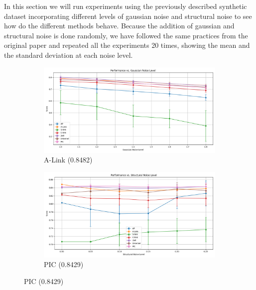 \documentclass[
	10pt,
	parskip=half-,	
	paper=a4,
	english
	]{scrartcl}
\begin{document}
In this section we will run experiments using the previously described synthetic dataset incorporating different levels of gaussian noise and structural noise to see how do the different methods behave. Because the addition of gaussian and structural noise is done randomly, we have followed the same practices from the original paper and repeated all the experiments 20 times, showing the mean and the standard deviation at each noise level.

\begin{figure}[h!]
    \centering
    \begin{subfigure}[b]{0.45\textwidth}
        \includegraphics[width=\textwidth]{../data/plots/results_gaussian_noise_blobs.png}
        \caption{A-Link (0.8482)}
    \end{subfigure}
    \begin{subfigure}[b]{0.45\textwidth}
        \includegraphics[width=\textwidth]{../data/plots/results_structural_noise_blobs.png}
        \caption{PIC (0.8429)}
    \end{subfigure}
    
    \vspace{0.3cm}
    

\end{figure}
\end{document}
